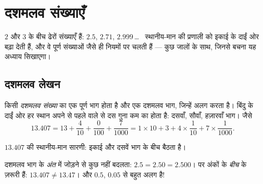 \chapter{दशमलव संख्याएँ}\label{ch:g6:decimals}

$2$ और $3$ के बीच ढेरों संख्याएँ हैं: $2.5$, $2.71$,
$2.999$\,\dots\  स्थानीय-मान की प्रणाली को इकाई के
दाईं ओर बढ़ा देती हैं, और वे पूर्ण संख्याओं जैसे ही नियमों पर
चलती हैं --- कुछ जालों के साथ, जिनसे बचना यह अध्याय सिखाएगा।

\section{दशमलव लेखन}

\begin{definition}[दशमलव स्थान]\label{def:g6:decimals:places}
किसी \emph{दशमलव संख्या} का एक पूर्ण भाग
होता है और एक दशमलव भाग, जिन्हें  अलग करता है। बिंदु
के दाईं ओर हर स्थान अपने से पहले वाले से दस गुना कम का होता है:
दसवाँ, सौवाँ, हज़ारवाँ भाग। जैसे
\[
13.407 = 13 + \frac{4}{10} + \frac{0}{100} + \frac{7}{1000}
= 1 \times 10 + 3 + 4 \times \frac{1}{10} + 7 \times \frac{1}{1000}.
\]
\end{definition}

\begin{omfigure}

{\small $13.407$ की स्थानीय-मान सारणी:  इकाई और दसवें
भाग के बीच बैठता है।}
\end{omfigure}

\begin{remark}[कुछ शून्य मायने रखते हैं, कुछ नहीं]
दशमलव भाग के \emph{अंत} में  जोड़ने से कुछ नहीं बदलता:
$2.5 = 2.50 = 2.500$। पर अंकों के \emph{बीच} के  ज़रूरी हैं:
$13.407 \neq 13.47$। और $0.5$, $0.05$ से बहुत अलग है!
\end{remark}

